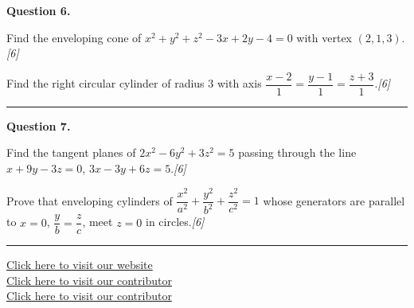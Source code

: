 \documentclass[11pt,a4paper]{article}
\newcommand{\pts}[1]{\hfill   \textit{[#1]}}
\begin{document}
\medskip


\noindent   \textbf{Question 6.}

\begin{parts}
  \item Find the enveloping cone of $x^2+y^2+z^2-3x+2y-4=0$ with vertex $(2,1,3)$.\pts{6}
  \item Find the right circular cylinder of radius $3$ with axis $\dfrac{x-2}{1}=\dfrac{y-1}{1}=\dfrac{z+3}{1}$.\pts{6}
\end{parts}
\medskip\rule{\linewidth}{0.2pt}

\medskip


\noindent   \textbf{Question 7.}

\begin{parts}
  \item Find the tangent planes of $2x^2-6y^2+3z^2=5$ passing through the line $x+9y-3z=0$, $3x-3y+6z=5$.\pts{6}
  \item Prove that enveloping cylinders of $\dfrac{x^2}{a^2}+\dfrac{y^2}{b^2}+\dfrac{z^2}{c^2}=1$ whose generators are parallel to $x=0$, $\dfrac{y}{b}=\dfrac{z}{c}$, meet $z=0$ in circles.\pts{6}
\end{parts}

\vfill\rule{\linewidth}{0.4pt}

\begin{center}\small
\href{https://bhu-exam.vercel.app/}{Click here to visit our website}\\[4pt]
\href{https://me-aryan.vercel.app/}{Click here to visit our contributor}\\[4pt]
\href{https://quashan-me.vercel.app/}{Click here to visit our contributor}
\end{center}
\end{document}
